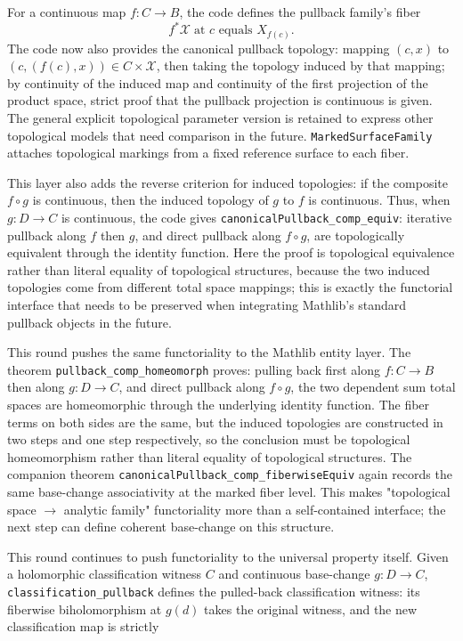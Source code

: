 \documentclass[UTF8,a4paper,11pt]{article}
\begin{document}
For a continuous map $f:C\to B$, the code defines the pullback family's fiber
\[
  f^*\mathcal X\;\text{at }c\text{ equals }X_{f(c)}.
\]
The code now also provides the canonical pullback topology: mapping $(c,x)$ to $(c,(f(c),x))\in C\times\mathcal X$, then taking the topology induced by that mapping; by continuity of the induced map and continuity of the first projection of the product space, strict proof that the pullback projection is continuous is given. The general explicit topological parameter version is retained to express other topological models that need comparison in the future. \texttt{MarkedSurfaceFamily} attaches topological markings from a fixed reference surface to each fiber.

This layer also adds the reverse criterion for induced topologies: if the composite $f\circ g$ is continuous, then the induced topology of $g$ to $f$ is continuous. Thus, when $g:D\to C$ is continuous, the code gives
\texttt{canonicalPullback\_comp\_equiv}: iterative pullback along $f$ then $g$, and direct pullback along $f\circ g$, are topologically equivalent through the identity function. Here the proof is topological equivalence rather than literal equality of topological structures, because the two induced topologies come from different total space mappings; this is exactly the functorial interface that needs to be preserved when integrating Mathlib's standard pullback objects in the future.

This round pushes the same functoriality to the Mathlib entity layer. The theorem
\texttt{pullback\_comp\_homeomorph} proves: pulling back first along
$f:C\to B$ then along $g:D\to C$, and direct pullback along $f\circ g$, the two dependent sum total spaces are homeomorphic through the underlying identity function. The fiber terms on both sides are the same, but the induced topologies are constructed in two steps and one step respectively, so the conclusion must be topological homeomorphism rather than literal equality of topological structures.
The companion theorem \texttt{canonicalPullback\_comp\_fiberwiseEquiv} again records the same base-change associativity at the marked fiber level. This makes "topological space \(\to\) analytic family" functoriality more than a self-contained interface; the next step can define coherent base-change on this structure.

This round continues to push functoriality to the universal property itself. Given a holomorphic classification witness $C$ and continuous base-change
$g:D\to C$, \texttt{classification\_pullback} defines the pulled-back classification witness:
its fiberwise biholomorphism at $g(d)$ takes the original witness, and the new classification map is strictly
\end{document}
